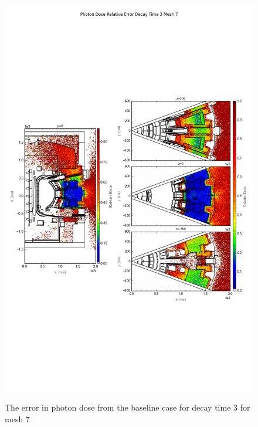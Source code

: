 \begin{figure}[ht!]
\centering
\includegraphics[trim={0cm 9cm 0cm 10cm},clip,scale=0.75]{../plots/final_model/Photon_Dose_Relative_Error_Decay_Time_3_Mesh_7.png}
\label{fig:photons_dc3_no4bc_m7_error}
\caption{The error in photon dose from the baseline case for decay time 3 for mesh 7}
\end{figure}
